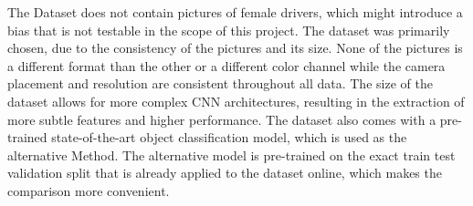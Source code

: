 \noindent
The Dataset does not contain pictures of female drivers, which might introduce a bias that is not testable in the scope of this project. The dataset was primarily chosen, due to the consistency of the pictures and its size. None of the pictures is a different format than the other or a different color channel while the camera placement and resolution are consistent throughout all data. The size of the dataset allows for more complex CNN architectures, resulting in the extraction of more subtle features and higher performance.
The dataset also comes with a pre-trained state-of-the-art object classification model, which is used as the alternative Method. The alternative model is pre-trained on the exact train test validation split that is already applied to the dataset online, which makes the comparison more convenient.